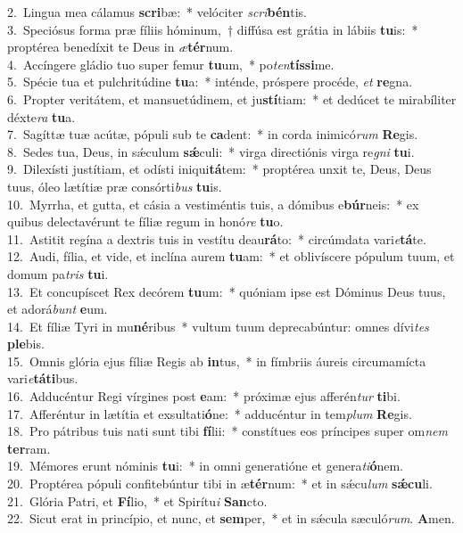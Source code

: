 {2.~}Lingua mea cálamus \textbf{scri}bæ:~* velóciter \textit{scri}\textbf{bén}tis.\\
{3.~}Speciósus forma præ fíliis hóminum,~† diffúsa est grátia in lábiis \textbf{tu}is:~* proptérea benedíxit te Deus in \textit{æ}\textbf{tér}num.\\
{4.~}Accíngere gládio tuo super femur \textbf{tu}um,~* po\textit{ten}\textbf{tís}\textbf{si}me.\\
{5.~}Spécie tua et pulchritúdine \textbf{tu}a:~* inténde, próspere procéde, \textit{et} \textbf{re}gna.\\
{6.~}Propter veritátem, et mansuetúdinem, et ju\textbf{stí}tiam:~* et dedúcet te mirabíliter déxte\textit{ra} \textbf{tu}a.\\
{7.~}Sagíttæ tuæ acútæ, pópuli sub te \textbf{ca}dent:~* in corda inimicó\textit{rum} \textbf{Re}gis.\\
{8.~}Sedes tua, Deus, in sǽculum \textbf{sǽ}culi:~* virga directiónis virga re\textit{gni} \textbf{tu}i.\\
{9.~}Dilexísti justítiam, et odísti iniqui\textbf{tá}tem:~* proptérea unxit te, Deus, Deus tuus, óleo lætítiæ præ consórti\textit{bus} \textbf{tu}is.\\
{10.~}Myrrha, et gutta, et cásia a vestiméntis tuis, a dómibus e\textbf{búr}neis:~* ex quibus delectavérunt te fíliæ regum in honó\textit{re} \textbf{tu}o.\\
{11.~}Astitit regína a dextris tuis in vestítu deau\textbf{rá}to:~* circúmdata vari\textit{e}\textbf{tá}te.\\
{12.~}Audi, fília, et vide, et inclína aurem \textbf{tu}am:~* et oblivíscere pópulum tuum, et domum pa\textit{tris} \textbf{tu}i.\\
{13.~}Et concupíscet Rex decórem \textbf{tu}um:~* quóniam ipse est Dóminus Deus tuus, et adorá\textit{bunt} \textbf{e}um.\\
{14.~}Et fíliæ Tyri in mu\textbf{né}ribus~* vultum tuum deprecabúntur: omnes dívi\textit{tes} \textbf{ple}bis.\\
{15.~}Omnis glória ejus fíliæ Regis ab \textbf{in}tus,~* in fímbriis áureis circumamícta vari\textit{e}\textbf{tá}\textbf{ti}bus.\\
{16.~}Adducéntur Regi vírgines post \textbf{e}am:~* próximæ ejus afferén\textit{tur} \textbf{ti}bi.\\
{17.~}Afferéntur in lætítia et exsultati\textbf{ó}ne:~* adducéntur in tem\textit{plum} \textbf{Re}gis.\\
{18.~}Pro pátribus tuis nati sunt tibi \textbf{fí}lii:~* constítues eos príncipes super om\textit{nem} \textbf{ter}ram.\\
{19.~}Mémores erunt nóminis \textbf{tu}i:~* in omni generatióne et genera\textit{ti}\textbf{ó}nem.\\
{20.~}Proptérea pópuli confitebúntur tibi in æ\textbf{tér}num:~* et in sǽcu\textit{lum} \textbf{sǽ}\textbf{cu}li.\\
{21.~}Glória Patri, et \textbf{Fí}lio,~* et Spirítu\textit{i} \textbf{San}cto.\\
{22.~}Sicut erat in princípio, et nunc, et \textbf{sem}per,~* et in sǽcula sæculó\textit{rum}. \textbf{A}men.\\
